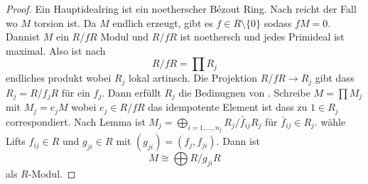 \begin{proof}
	Ein Hauptidealring ist ein noetherscher Bézout Ring. Nach  reicht der Fall wo \(M\) torsion ist. Da \(M\) endlich erzeugt, gibt es \(f\in R\setminus\{0\}\) sodass \(fM=0\). Dannist \(M\) ein \(R/fR\) Modul und \(R/fR\) ist noethersch und jedes Primideal ist maximal. Also ist  nach  \[R/fR=\prod R_j\] endliches produkt wobei \(R_j\) lokal artinsch. Die Projektion \(R/fR\to R_j\) gibt dass \(R_j=R/f_jR\) für ein \(f_j\). Dann erfüllt \(R_j\) die Bedinugnen von . Schreibe \(M=\prod M_j\) mit \(M_j=e_jM\) wobei \(e_j\in R/fR\) das idempotente Element ist dass zu \(1\in R_j\) correspondiert.  Nach Lemma  ist \(M_j=\bigoplus_{i=1,\dots,n_j}R_j/\bar f_{ij}R_j\) für \(\bar f_{ij}\in R_j\). wähle Lifts \(f_{ij}\in R\) und \(g_{ji}\in R\) mit \((g_{ji})=(f_j,f_{ji})\). Dann ist \[M\cong\bigoplus R/g_{ji}R\] als \(R\)-Modul.
\end{proof}
